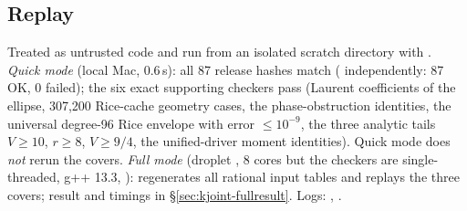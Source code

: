 \subsection{Replay}\label{sec:kjoint-replay}
Treated as untrusted code and run from an isolated scratch directory with . \emph{Quick mode} (local Mac, 0.6\,s): all 87 release hashes match
( independently: 87 OK, 0 failed); the six exact supporting checkers pass (Laurent coefficients of the ellipse, 307,200 Rice-cache geometry cases,
the phase-obstruction identities, the universal degree-96 Rice envelope with error $\le10^{-9}$, the three analytic tails $V\ge10$, $r\ge8$, $V\ge9/4$, the unified-driver moment
identities). Quick mode does \emph{not} rerun the covers. \emph{Full mode} (droplet , 8 cores but the checkers are single-threaded, g++ 13.3, ): regenerates all rational input tables and replays the three covers; result and timings in \S\ref{sec:kjoint-fullresult}. Logs:
, .

